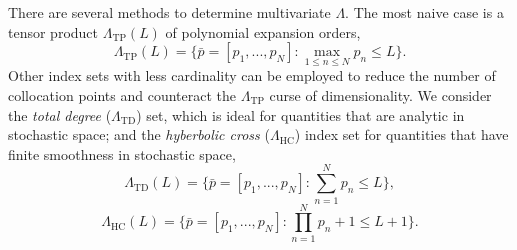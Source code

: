\documentclass{anstrans}
\begin{document}
There are several methods to determine multivariate $\Lambda$.
The most naive case is a tensor product $\Lambda_\text{TP}(L)$ of polynomial expansion orders,
\begin{equation}
\Lambda_\text{TP}(L)=\Big\{\bar p=[p_1,...,p_N]: \max_{1\leq n\leq N}p_n\leq L \Big\}.%
\end{equation}
Other index sets with less cardinality can be employed to reduce the number of collocation points and counteract the $\Lambda_\text{TP}$ curse of dimensionality.  We consider the \emph{total degree} ($\Lambda_\text{TD}$) set, which is ideal for quantities that are analytic in stochastic space; and the \emph{hyberbolic cross} ($\Lambda_\text{HC}$) index set for quantities that have finite smoothness in stochastic space,
\begin{equation}
\Lambda_\text{TD}(L)=\Big\{\bar p=[p_1,...,p_N]:\sum_{n=1}^N p_n \leq L \Big\},%
\end{equation}
\begin{equation}
\Lambda_\text{HC}(L)=\Big\{\bar p=[p_1,...,p_N]:\prod_{n=1}^N p_n+1 \leq L+1 \Big\}.
\end{equation}
%
\end{document}
